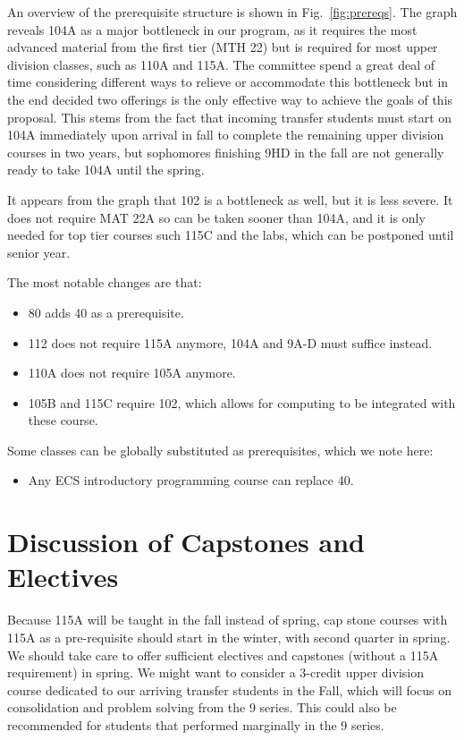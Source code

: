 \documentclass[12pt]{article}
\begin{document}
An overview of the prerequisite structure is shown in Fig.~\ref{fig:prereqs}.  
The graph reveals 104A as a major bottleneck in our program, as it requires the most advanced material from the first tier (MTH 22) but is required for most upper division classes, such as 110A and 115A.  The committee spend a great deal of time considering different ways to relieve or accommodate this bottleneck but in the end decided two offerings is the only effective way to achieve the goals of this proposal.  This stems from the fact that incoming transfer students must start on 104A immediately upon arrival in fall to complete the remaining upper division courses in two years, but sophomores finishing 9HD in the fall are not generally ready to take 104A until the spring.  

It appears from the graph that 102 is a bottleneck as well, but it is less severe.  It does not require MAT 22A so can be taken sooner than 104A, and it is only needed for top tier courses such 115C and the labs, which can be postponed until senior year.

The most notable changes are that:
\begin{itemize}
\item 80 adds 40 as a prerequisite.
\item 112 does not require 115A anymore, 104A and 9A-D must suffice instead.
\item 110A does not require 105A anymore. 
\item 105B and 115C require 102, which allows for computing to be integrated with these course. 
\end{itemize}
Some classes can be globally substituted as prerequisites, which we note here:
\begin{itemize}
\item Any ECS introductory programming course can replace 40.
\end{itemize}

\section{Discussion of Capstones and Electives}

Because 115A will be taught in the fall instead of spring, cap stone courses with 115A as a pre-requisite should start in the winter, with second quarter in spring.  We should take care to offer sufficient electives and capstones (without a 115A requirement) in spring.  We might want to consider a 3-credit upper division course dedicated to our arriving transfer students in the Fall, which will focus on consolidation and problem solving from the 9 series.  This could also be recommended for students that performed marginally in the 9 series.
\end{document}
